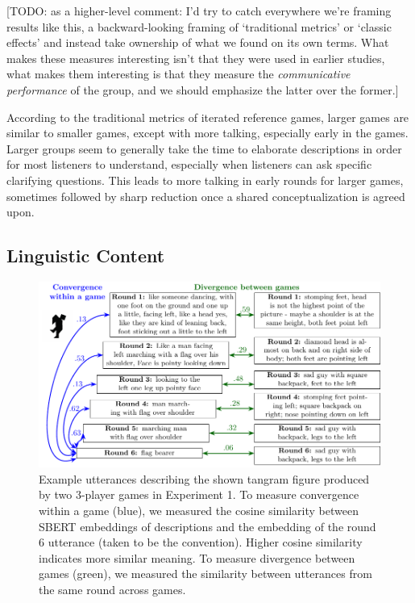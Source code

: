 \documentclass[
  english,
  a4paper,
]{article}
\begin{document}
{[}TODO: as a higher-level comment: I'd try to catch everywhere we're framing results like this, a backward-looking framing of `traditional metrics' or `classic effects' and instead take ownership of what we found on its own terms. What makes these measures interesting isn't that they were used in earlier studies, what makes them interesting is that they measure the \emph{communicative performance} of the group, and we should emphasize the latter over the former.{]}

According to the traditional metrics of iterated reference games, larger games are similar to smaller games, except with more talking, especially early in the games. Larger groups seem to generally take the time to elaborate descriptions in order for most listeners to understand, especially when listeners can ask specific clarifying questions. This leads to more talking in early rounds for larger games, sometimes followed by sharp reduction once a shared conceptualization is agreed upon.

\hypertarget{linguistic-content}{%
\subsection{Linguistic Content}\label{linguistic-content}}

\begin{figure}[t!]

{\centering \includegraphics[width=1\linewidth]{sbert} 

}

\caption{Example utterances describing the shown tangram figure produced by two 3-player games in Experiment 1. To measure convergence within a game (blue), we measured the cosine similarity between SBERT embeddings of descriptions and the embedding of the round 6 utterance (taken to be the convention). Higher cosine similarity indicates more similar meaning. To measure divergence between games (green), we measured the similarity between utterances from the same round across games.}\label{fig:sbert-diagram}
\end{figure}
\end{document}

